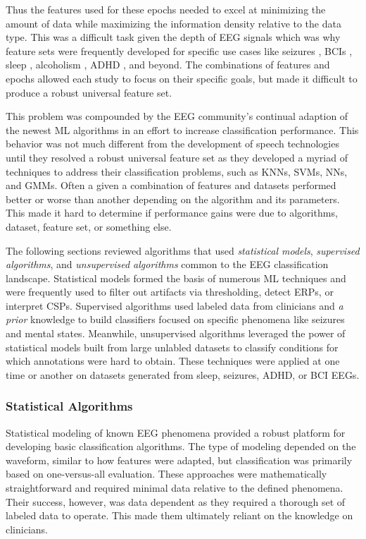 Thus the features used for these epochs needed to excel at minimizing the amount of data while maximizing the information density relative to the data type. This was a difficult task given the depth of \ac{EEG} signals which was why feature sets were frequently developed for specific use cases like seizures \cite{Chu2017}, \acp{BCI} \cite{Blankertz2008}, sleep \cite{Warby2014}, alcoholism \cite{Porjesz2005}, \ac{ADHD} \cite{Marcano2018}, and beyond. The combinations of features and epochs allowed each study to focus on their specific goals, but made it difficult to produce a robust universal feature set.

This problem was compounded by the \ac{EEG} community's continual adaption of the newest \ac{ML} algorithms in an effort to increase classification performance. This behavior was not much different from the development of speech technologies until they resolved a robust universal feature set \cite{Davis1980} as they developed a myriad of techniques to address their classification problems, such as \acp{KNN}, \acp{SVM}, \acp{NN}, and \acp{GMM}. Often a given a combination of features and datasets performed better or worse than another depending on the algorithm and its parameters. This made it hard to determine if performance gains were due to algorithms, dataset, feature set, or something else. 

The following sections reviewed algorithms that used \emph{statistical models}, \emph{supervised algorithms}, and \emph{unsupervised algorithms} common to the \ac{EEG} classification landscape. Statistical models formed the basis of numerous \ac{ML} techniques and were frequently used to filter out artifacts via thresholding, detect \acp{ERP}, or interpret \acp{CSP}. Supervised algorithms used labeled data from clinicians and \emph{a prior} knowledge to build classifiers focused on specific phenomena like seizures and mental states. Meanwhile, unsupervised algorithms leveraged the power of statistical models built from large unlabled datasets to classify conditions for which annotations were hard to obtain. These techniques were applied at one time or another on datasets generated from sleep, seizures, \ac{ADHD}, or \ac{BCI} \acp{EEG}.

\subsubsection{Statistical Algorithms}

Statistical modeling of known \ac{EEG} phenomena provided a robust platform for developing basic classification algorithms. The type of modeling depended on the waveform, similar to how features were adapted, but classification was primarily based on one-versus-all evaluation. These approaches were mathematically straightforward and required minimal data relative to the defined phenomena. Their success, however, was data dependent as they required a thorough set of labeled data to operate. This made them ultimately reliant on  the knowledge on clinicians.

